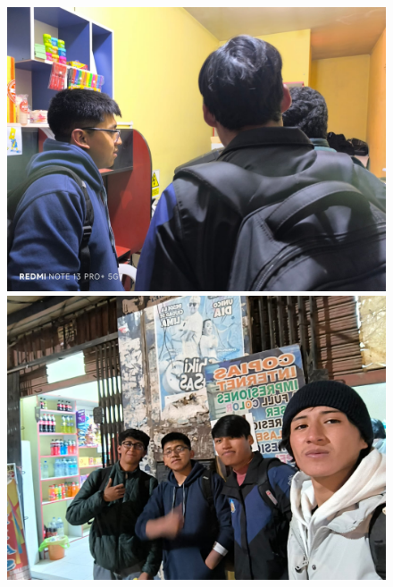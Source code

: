 \documentclass[12pt]{article}
\begin{document}
\begin{figure}[htbp]
\vspace{1cm}

\begin{minipage}[b]{0.48\textwidth}
  \centering
  \includegraphics[width=\textwidth]{3.jpeg}
  
\end{minipage}
\hfill
\begin{minipage}[b]{0.48\textwidth}
  \centering
  \includegraphics[width=\textwidth]{4.jpeg}
 
\end{minipage}

\end{figure}
\end{document}
